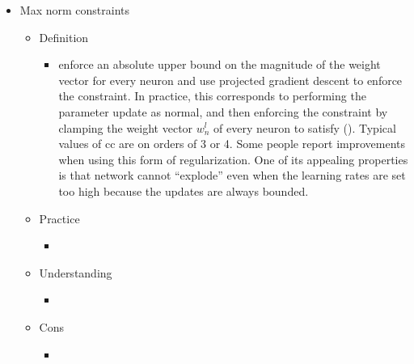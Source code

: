 \begin{itemize}
\item Max norm constraints
	\begin{itemize}
	\item Definition
		\begin{itemize}
		\item enforce an absolute upper bound on the magnitude of the weight vector for every neuron and use projected gradient descent to enforce the constraint. In practice, this corresponds to performing the parameter update as normal, and then enforcing the constraint by clamping the weight vector $w^l_n$ of every neuron to satisfy (). Typical values of cc are on orders of 3 or 4. Some people report improvements when using this form of regularization. One of its appealing properties is that network cannot “explode” even when the learning rates are set too high because the updates are always bounded.
		\end{itemize}
	\item Practice
		\begin{itemize}
		\item 
		\end{itemize}
	\item Understanding
		\begin{itemize}
		\item 
		\end{itemize}
	\item Cons
		\begin{itemize}
		\item 
		\end{itemize}
	\end{itemize}


\end{itemize}
